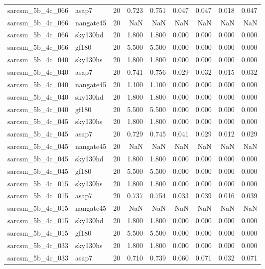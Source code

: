 \begin{tabular}{llrrrrrrr}
sarcsm\_5b\_4c\_066 & asap7 & 20 & 0.723 & 0.751 & 0.047 & 0.047 & 0.018 & 0.047 \\
sarcsm\_5b\_4c\_066 & nangate45 & 20 & NaN & NaN & NaN & NaN & NaN & NaN \\
sarcsm\_5b\_4c\_066 & sky130hd & 20 & 1.800 & 1.800 & 0.000 & 0.000 & 0.000 & 0.000 \\
sarcsm\_5b\_4c\_066 & gf180 & 20 & 5.500 & 5.500 & 0.000 & 0.000 & 0.000 & 0.000 \\
sarcsm\_5b\_4c\_040 & sky130hs & 20 & 1.800 & 1.800 & 0.000 & 0.000 & 0.000 & 0.000 \\
sarcsm\_5b\_4c\_040 & asap7 & 20 & 0.741 & 0.756 & 0.029 & 0.032 & 0.015 & 0.032 \\
sarcsm\_5b\_4c\_040 & nangate45 & 20 & 1.100 & 1.100 & 0.000 & 0.000 & 0.000 & 0.000 \\
sarcsm\_5b\_4c\_040 & sky130hd & 20 & 1.800 & 1.800 & 0.000 & 0.000 & 0.000 & 0.000 \\
sarcsm\_5b\_4c\_040 & gf180 & 20 & 5.500 & 5.500 & 0.000 & 0.000 & 0.000 & 0.000 \\
sarcsm\_5b\_4c\_045 & sky130hs & 20 & 1.800 & 1.800 & 0.000 & 0.000 & 0.000 & 0.000 \\
sarcsm\_5b\_4c\_045 & asap7 & 20 & 0.729 & 0.745 & 0.041 & 0.029 & 0.012 & 0.029 \\
sarcsm\_5b\_4c\_045 & nangate45 & 20 & NaN & NaN & NaN & NaN & NaN & NaN \\
sarcsm\_5b\_4c\_045 & sky130hd & 20 & 1.800 & 1.800 & 0.000 & 0.000 & 0.000 & 0.000 \\
sarcsm\_5b\_4c\_045 & gf180 & 20 & 5.500 & 5.500 & 0.000 & 0.000 & 0.000 & 0.000 \\
sarcsm\_5b\_4c\_015 & sky130hs & 20 & 1.800 & 1.800 & 0.000 & 0.000 & 0.000 & 0.000 \\
sarcsm\_5b\_4c\_015 & asap7 & 20 & 0.737 & 0.754 & 0.033 & 0.039 & 0.016 & 0.039 \\
sarcsm\_5b\_4c\_015 & nangate45 & 20 & NaN & NaN & NaN & NaN & NaN & NaN \\
sarcsm\_5b\_4c\_015 & sky130hd & 20 & 1.800 & 1.800 & 0.000 & 0.000 & 0.000 & 0.000 \\
sarcsm\_5b\_4c\_015 & gf180 & 20 & 5.500 & 5.500 & 0.000 & 0.000 & 0.000 & 0.000 \\
sarcsm\_5b\_4c\_033 & sky130hs & 20 & 1.800 & 1.800 & 0.000 & 0.000 & 0.000 & 0.000 \\
sarcsm\_5b\_4c\_033 & asap7 & 20 & 0.710 & 0.739 & 0.060 & 0.071 & 0.032 & 0.071 \\

\end{tabular}
